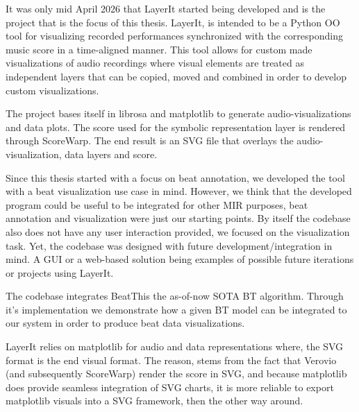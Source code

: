 
It was only mid April 2026 that LayerIt started being developed and is the project that is the focus of this thesis. LayerIt, is intended to be a Python OO tool for visualizing recorded performances synchronized with the corresponding music score in a time-aligned manner. This tool allows for custom made visualizations of audio recordings where visual elements are treated as independent layers that can be copied, moved and combined in order to develop custom visualizations. 

The project bases itself in librosa and matplotlib to generate audio-visualizations and data plots. The score used for the symbolic representation layer is rendered through ScoreWarp. The end result is an SVG file that overlays the audio-visualization, data layers and score.

Since this thesis started with a focus on beat annotation, we developed the tool with a beat visualization use case in mind. However, we think that the developed program could be useful to be integrated for other MIR purposes, beat annotation and visualization were just our starting points. By itself the codebase also does not have any user interaction provided, we focused on the visualization task. Yet, the codebase was designed with future development/integration in mind. A GUI or a web-based solution being examples of possible future iterations or projects using LayerIt. 

The codebase integrates BeatThis the as-of-now SOTA BT algorithm. Through it's implementation we demonstrate how a given BT model can be integrated to our system in order to produce beat data visualizations.  

LayerIt relies on matplotlib for audio and data representations where, the SVG format is the end visual format. The reason, stems from the fact that Verovio (and subsequently ScoreWarp) render the score in SVG, and because matplotlib does provide seamless integration of SVG charts, it is more reliable to export matplotlib visuals into a SVG framework, then the other way around.

